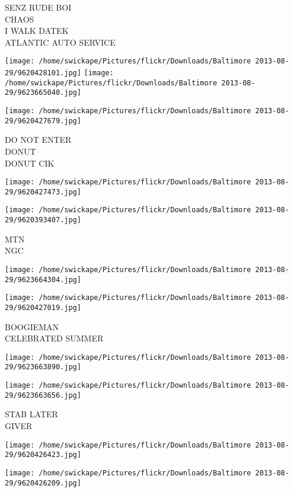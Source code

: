 \documentclass[10pt,letterpaper]{article}
\begin{document}
SENZ RUDE BOI\\
CHAOS\\
I WALK  DATEK\\
ATLANTIC AUTO SERVICE
\pagebreak

\texttt{[image: /home/swickape/Pictures/flickr/Downloads/Baltimore 2013-08-29/9620428101.jpg]}
\texttt{[image: /home/swickape/Pictures/flickr/Downloads/Baltimore 2013-08-29/9623665040.jpg]}

\texttt{[image: /home/swickape/Pictures/flickr/Downloads/Baltimore 2013-08-29/9620427679.jpg]}

DO NOT ENTER\\
DONUT\\
DONUT CIK
\pagebreak

\texttt{[image: /home/swickape/Pictures/flickr/Downloads/Baltimore 2013-08-29/9620427473.jpg]}

\vspace{0.25in}
\texttt{[image: /home/swickape/Pictures/flickr/Downloads/Baltimore 2013-08-29/9620393407.jpg]}

MTN\\
NGC
\pagebreak

\texttt{[image: /home/swickape/Pictures/flickr/Downloads/Baltimore 2013-08-29/9623664304.jpg]}

\vspace{0.25in}
\texttt{[image: /home/swickape/Pictures/flickr/Downloads/Baltimore 2013-08-29/9620427019.jpg]}

BOOGIEMAN\\
CELEBRATED SUMMER
\pagebreak

\texttt{[image: /home/swickape/Pictures/flickr/Downloads/Baltimore 2013-08-29/9623663890.jpg]}

\vspace{0.25in}
\texttt{[image: /home/swickape/Pictures/flickr/Downloads/Baltimore 2013-08-29/9623663656.jpg]}

STAB LATER\\
GIVER
\pagebreak

\texttt{[image: /home/swickape/Pictures/flickr/Downloads/Baltimore 2013-08-29/9620426423.jpg]}

\vspace{0.25in}
\texttt{[image: /home/swickape/Pictures/flickr/Downloads/Baltimore 2013-08-29/9620426209.jpg]}
\end{document}
